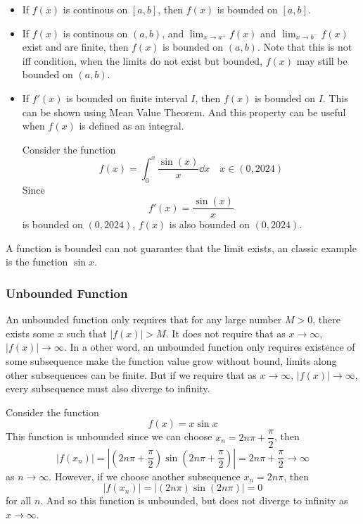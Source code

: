 \documentclass{overview}
\begin{document}
\begin{itemize}
	\item If $f(x)$ is continous on  $[a, b]$, then $f(x)$ is bounded on $[a, b]$.
	\item If $f(x)$ is continous on $(a, b)$, and $\lim_{x \to a^+} f(x)$ and
		$\lim_{x \to b^-} f(x)$ exist and are finite, then $f(x)$ is bounded on $(a, b)$.
		Note that this is not iff condition, when the limits do not exist but bounded,
		$f(x)$ may still be bounded on $(a, b)$.
	\item If $f'(x)$ is bounded on finite interval $I$, then $f(x)$ is bounded on $I$.
		This can be shown using Mean Value Theorem. And this property can be useful
		when $f(x)$ is defined as an integral.
		\begin{example}
			Consider the function
			\[
				f(x) = \int_0^x \frac{\sin(x)}{x} \dd x \quad x \in (0, 2024)
			\]
			Since
			\[
				f'(x) = \frac{\sin(x)}{x}
			\]
			is bounded on $(0, 2024)$, $f(x)$ is also bounded on $(0, 2024)$.

			
		\end{example}

\end{itemize}

A function is bounded can not guarantee that the limit exists, an classic example
is the function $\sin x$.

\subsubsection{Unbounded Function}

An unbounded function only requires that for any large number $M>0$, there exists
some $x$ such that $|f(x)|>M$. It does not require that as $x \to \infty$, $|f(x)| \to \infty$.
In a other word, an unbounded function only requires existence of some subsequence
make the function value grow without bound, limits along other subsequences can be finite.
But if we require that as $x \to \infty$, $|f(x)| \to \infty$, every subsequence must
also diverge to infinity.

\begin{example}
	Consider the function
	\[
		f(x) = x \sin x
	\] 
	This function is unbounded since we can choose $x_n = 2n\pi + \dfrac{\pi}{2}$,
	then
	\[
		|f(x_n)| = \left| \left(2n\pi + \dfrac{\pi}{2}\right) \sin\left(2n\pi + \dfrac{\pi}{2}\right) \right| = 2n\pi + \dfrac{\pi}{2} \to \infty
	\]
	as $n \to \infty$. However, if we choose another subsequence $x_n = 2n\pi$,
	then
	\[
		|f(x_n)| = \left| \left(2n\pi\right) \sin\left(2n\pi\right) \right| = 0
	\]
	for all $n$. And so this function is unbounded, but does not diverge to infinity as $x \to \infty$.
\end{example}
\end{document}
